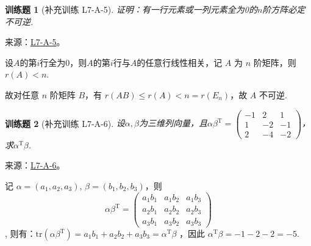 \documentclass[12pt,fontset=fandol]{ctexart}
\newtheorem{exercise}{训练题}[section]
\begin{document}
\begin{exercise}[补充训练 L7-A-5]\label{prob:L7-A-5}
证明：有一行元素或一列元素全为0的$n$阶方阵必定不可逆.
\end{exercise}
\noindent 来源：\href{https://github.com/yhwu-is/Linear-Algebra-Left-Undone/blob/new/%E8%AE%B2%E4%B9%89/%E4%B8%93%E9%A2%98/7%20%E7%BA%BF%E6%80%A7%E6%98%A0%E5%B0%84%E7%9F%A9%E9%98%B5%E8%A1%A8%E7%A4%BA%E4%B8%8E%E7%9F%A9%E9%98%B5%E8%BF%90%E7%AE%97%E5%9F%BA%E7%A1%80.tex}{L7-A-5}。
\begin{solve}
设$A$的第$i$行全为0，则$A$的第$i$行与$A$的任意行线性相关，记 $A$ 为 $n$ 阶矩阵，则$r(A) < n$.

            故对任意 $n$ 阶矩阵 $B$，有 $r(AB) \leqslant r(A) < n = r(E_n)$，故 $A$ 不可逆.
\end{solve}

\begin{exercise}[补充训练 L7-A-6]\label{prob:L7-A-6}
设$\alpha,\beta$为三维列向量，且$\alpha\beta^\mathrm{T}=\begin{pmatrix}
                -1 & 2  & 1  \\
                1  & -2 & -1 \\
                2  & -4 & -2
            \end{pmatrix}$，求$\alpha^\mathrm{T}\beta$.
\end{exercise}
\noindent 来源：\href{https://github.com/yhwu-is/Linear-Algebra-Left-Undone/blob/new/%E8%AE%B2%E4%B9%89/%E4%B8%93%E9%A2%98/7%20%E7%BA%BF%E6%80%A7%E6%98%A0%E5%B0%84%E7%9F%A9%E9%98%B5%E8%A1%A8%E7%A4%BA%E4%B8%8E%E7%9F%A9%E9%98%B5%E8%BF%90%E7%AE%97%E5%9F%BA%E7%A1%80.tex}{L7-A-6}。
\begin{solve}
记 $\alpha = (a_1,a_2,a_3)$, $\beta = (b_1,b_2,b_3)$，则 
\[\alpha\beta^\mathrm{T} = \begin{pmatrix}
                    a_1b_1 & a_1b_2 & a_1b_3 \\
                    a_2b_1 & a_2b_2 & a_2b_3 \\
                    a_3b_1 & a_3b_2 & a_3b_3
                \end{pmatrix}\]
,
            则有：$\text{tr}(\alpha\beta^\mathrm{T}) = a_1b_1+a_2b_2+a_3b_3 = \alpha^\mathrm{T}\beta$ ，因此 $\alpha^\mathrm{T}\beta = -1-2-2 = -5$.
\end{solve}
\end{document}
